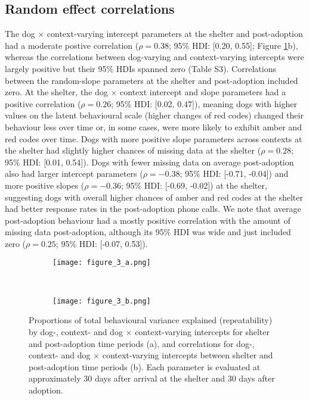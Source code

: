 \documentclass[12pt]{article}
\begin{document}
\subsection{Random effect correlations}
The dog $\times$ context-varying intercept parameters at the shelter and post-adoption had a moderate postive correlation ($\rho = 0.38$; 95\% HDI: [0.20, 0.55]; Figure \ref{fig_corrs_rept}b), whereas the correlations between dog-varying and context-varying intercepts were largely positive but their 95\% HDIs spanned zero (Table S3). Correlations between the random-slope parameters at the shelter and post-adoption included zero. At the shelter, the dog $\times$ context intercept and slope parameters had a positive correlation ($\rho = 0.26$; 95\% HDI: [0.02, 0.47]), meaning dogs with higher values on the latent behavioural scale (higher changes of red codes) changed their behaviour less over time or, in some cases, were more likely to exhibit amber and red codes over time. Dogs with more positive slope parameters across contexts at the shelter had slightly higher chances of missing data at the shelter ($\rho = 0.28$; 95\% HDI: [0.01, 0.54]). Dogs with fewer missing data on average post-adoption also had larger intercept parameters ($\rho = -0.38$; 95\% HDI: [-0.71, -0.04]) and more positive slopes ($\rho = -0.36$; 95\% HDI: [-0.69, -0.02]) at the shelter, suggesting dogs with overall higher chances of amber and red codes at the shelter had better response rates in the post-adoption phone calls. We note that average post-adoption behaviour had a mostly positive correlation with the amount of missing data post-adoption, although its 95\% HDI was wide and just included zero ($\rho = 0.25$; 95\% HDI: [-0.07, 0.53]).

\begin{figure}[t!]
  \centering
  \begin{subfigure}{0.5\textwidth}
    \centering
    \texttt{[image: figure\_3\_a.png]}
  \end{subfigure}%
  ~
  \begin{subfigure}{0.5\textwidth}
    \centering
    \texttt{[image: figure\_3\_b.png]}
  \end{subfigure}
  \caption{Proportions of total behavioural variance explained (repeatability) by dog-, context- and dog $\times$ context-varying intercepts for shelter and post-adoption time periods (a), and correlations for dog-, context- and dog $\times$ context-varying intercepts between shelter and post-adoption time periods (b). Each parameter is evaluated at approximately 30 days after arrival at the shelter and 30 days after adoption.}
  \label{fig_corrs_rept}
\end{figure}
\end{document}
